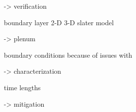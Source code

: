 -> verification

boundary layer
2-D
3-D
slater model

-> plenum 

boundary conditions
because of issues with 

-> characterization

time lengths

-> mitigation